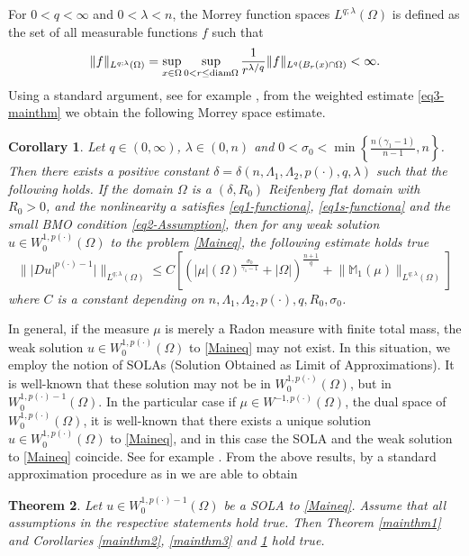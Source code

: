 \documentclass[a4paper,10pt]{amsart}
\newtheorem{thm}{Theorem}[section]
\newtheorem{cor}[thm]{Corollary}
\newcommand{\Mu}{\mathbb{M}_1(\mu)}
\newcommand{\pd}{p(\cdot)}
\newcommand{\f}{\frac}
\newcommand{\Om}{\Omega}
\newcommand{\vc}{\infty}
\begin{document}
For $0<q<\vc$ and $0<\lambda<n$, the  Morrey function spaces $L^{q;\lambda}(\Omega)$ is defined as the set of all measurable functions $f$ such that
$$
\|f\|_{L^{q; \lambda}(\Omega)}=\sup_{x\in \Omega}\sup_{0<r\leq {\rm diam}\Omega}\f{1}{r^{\lambda/q}}\|f\|_{L^{q}(B_{r}(x)\cap \Omega)}<\vc.
$$
Using a standard argument, see for example \cite{Ph}, from the weighted estimate \eqref{eq3-mainthm} we obtain the following Morrey space estimate.
\begin{cor}\label{mainthm4}
	Let $q\in (0,\vc)$, $\lambda\in (0,n)$ and $0<\sigma_0<\min\left\{\f{n(\gamma_1-1)}{n-1},n\right\}$. Then there
	exists  a positive constant $\delta=\delta(n,\Lambda_1, \Lambda_2, \pd,q,\lambda)$ such that the following holds. If the domain $\Omega$ is a $(\delta, R_0)$ Reifenberg flat domain with $ R_0>0$, and the nonlinearity $a$  satisfies \eqref{eq1-functiona}, \eqref{eq1s-functiona} and the small BMO condition \eqref{eq2-Assumption}, then for any weak solution $u\in W_0^{1,\pd}(\Om)$ to the problem \eqref{Maineq}, the following estimate holds true
	\begin{equation}\label{eq4-mainthm}
	\Big\||Du|^{p(\cdot)-1}|\Big\|_{L^{q;\lambda}(\Om)} \leq C\left[(|\mu|(\Om)^{\f{\sigma_0}{\gamma_1-1}}+|\Om|)^{\f{n+1}{q}} + \Big\|\Mu\Big\|_{L^{q;\lambda}(\Om)}\right]
	\end{equation}
	where $C$ is a constant depending on $n,\Lambda_1, \Lambda_2, \pd, q, R_0,\sigma_0$.
	
\end{cor}

In general, if the measure $\mu$ is merely a Radon measure with finite total mass, the weak solution $u\in W^{1,\pd}_0(\Om)$ to \eqref{Maineq} may not exist. In this situation, we employ the notion of SOLAs (Solution Obtained as Limit of Approximations). It is well-known that these solution may not be in $W^{1,\pd}_0(\Om)$, but in $W^{1,\pd -1}_0(\Om)$. In the particular case if $\mu\in W^{-1,\pd}(\Om)$, the dual space of $W^{1,\pd}_0(\Om)$, it is well-known that there exists a unique solution $u\in W^{1,\pd}_0(\Om)$ to \eqref{Maineq}, and in this case the SOLA and the weak solution to \eqref{Maineq} coincide.  See for example \cite{BH}.  From the above results, by a standard approximation procedure as in \cite{BH} we are able to obtain
\begin{thm}
	\label{mainthm5}
	Let $u\in W^{1,\pd -1}_0(\Om)$ be a SOLA to \eqref{Maineq}. Assume that all assumptions in the respective statements hold true. Then Theorem \ref{mainthm1} and Corollaries \ref{mainthm2}, \ref{mainthm3} and \ref{mainthm4} hold true. 
\end{thm}
\end{document}
